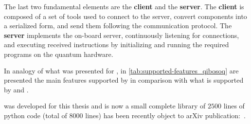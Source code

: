 The last two fundamental elements are the \textbf{client} and the \textbf{server}.
The \textbf{client} is composed of a set of tools used to connect to the server, convert components into a serialized form, and send them following the \Qibosoq communication protocol.
The \textbf{server} implements the on-board server, continuously listening for connections, and executing received instructions by initializing and running the required programs on the quantum hardware.

In analogy of what was presented for \Qibolab, in \cref{tab:supported-features_qibosoq} are presented the main features supported by \Qibosoq in comparison with what is supported by \Qick and \Qibolab.


\Qibosoq was developed for this thesis and is now a small complete library of $2500$ lines of python code (total of $8000$ lines) has been recently object to arXiv publication:~\cite{qibosoq_paper}.
